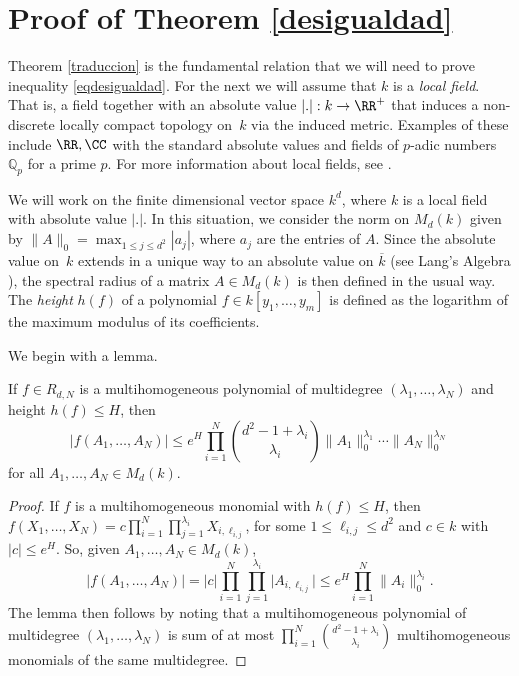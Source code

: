 \section{Proof of Theorem \ref{desigualdad}}\label{pruebadesigualdad}

Theorem \ref{traduccion} is the fundamental relation that we will need to prove inequality \eqref{eqdesigualdad}. For the next we will assume that $k$ is a \textit{local field}. That is, a field together with an absolute value $|.|:k\rightarrow \RR^{+}$ that induces a non-discrete locally compact topology on~$k$ via the induced metric. Examples of these include $\RR,\CC$ with the standard absolute values and fields of $p$-adic numbers $\mathbb{Q}_{p}$ for a prime $p$. For more information about local fields, see \cite{lorentz}.

We will work on the finite dimensional vector space $k^d$, where $k$ is a local field with absolute value $|.|$. In this situation, we consider the norm on $M_{d}(k)$ given by $\|A\|_{0}=\max_{1\leq j\leq d^2}{|a_{j}|}$, where $a_j$ are the entries of $A$. Since the absolute value on~$k$ extends in a unique way to an absolute value on $\overline{k}$ (see Lang's Algebra \cite[XII.2, Prop.\,2.5]{langalg}), the spectral radius of a matrix $A\in M_{d}(k)$ is then defined in the usual way.
The \emph{height} $h(f)$ of a polynomial $f\in k[y_1,\dots,y_m]$ is defined as the logarithm of the maximum modulus of its coefficients.

We begin with a lemma.

\begin{lema}\label{cotahomo}If $f \in R_{d,N}$ is a multihomogeneous polynomial of multidegree $(\lambda_1,\dots,\lambda_{N})$ and height $h(f)\leq H$, then
\begin{equation*}
|f(A_1,\dots,A_N)|\leq e^H\prod_{i=1}^{N}{\binom{d^2-1+\lambda_i}{\lambda_i}}\|A_1\|_{0}^{\lambda_1}\cdots\|A_{N}\|_{0}^{\lambda_N}
\end{equation*}
for all $A_1,\dots,A_N\in M_{d}(k)$.
\end{lema}

\begin{proof}
If $f$ is a multihomogeneous monomial with $h(f)\!\leq\!H$, then
$f(X_1,\dots,X_N)=c\prod_{i=1}^{N}{\prod_{j=1}^{\lambda_{i}}{X_{i ,\ell_{i,j}}}}$, for some $1\leq\ell_{i,j} \leq d^2$ and $c\in k$ with $|c|\leq e^H$. So, given $A_1,\dots,A_N\in M_{d}(k)$,
\begin{equation*}
|f(A_1,\dots,A_N)|=|c|\prod_{i=1}^{N}{\prod_{j=1}^{\lambda_{i}}{|A_{i ,\ell_{i,j}}}|}\leq e^H\prod_{i=1}^{N}{\|A_i\|_{0}^{\lambda_{i}}}.
\end{equation*}
The lemma then follows by noting that a multihomogeneous polynomial of multidegree $(\lambda_1,\dots,\lambda_N)$ is sum of at most $\prod_{i=1}^{N}{\binom{d^2-1+\lambda_i}{\lambda_i}}$ multihomogeneous monomials of the same multidegree.
\end{proof}


